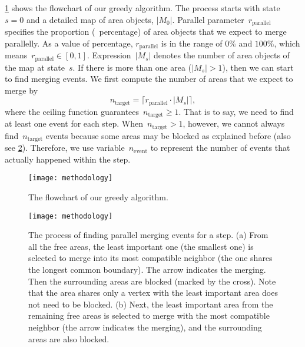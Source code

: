 \documentclass[ijgi,article,submit,moreauthors,pdftex]{Definitions/mdpi}
\begin{document}
\fig\ref{fig:greedy_framework} shows the flowchart of our greedy algorithm.
The process starts with state~$s=0$ and a detailed map of area objects, $|M_0|$.
Parallel parameter~$r_\mathrm{parallel}$ specifies 
the proportion (\ie~percentage) of area objects that
we expect to merge parallelly.
As a value of percentage, $r_\mathrm{parallel}$ is in the range of $0\%$ and $100\%$,
which means~$r_\mathrm{parallel} \in [0,1]$.
Expression~$|M_s|$ denotes the number of area objects of the map at state~$s$.
If there is more than one area ($|M_s|>1$),
then we can start to find merging events.
We first compute the number of areas that we expect to merge by
\begin{equation}
\label{eq:n_target}
n_\mathrm{target} =
\lceil r_\mathrm{parallel} \cdot |M_s| \rceil,
\end{equation}
where the ceiling function guarantees~$n_\mathrm{target}\ge 1$.
That is to say, we need to find at least one event for each step.
When~$n_\mathrm{target} > 1$, however,
we cannot always find~$n_\mathrm{target}$ events
because some areas may be blocked as explained before
(also see \fig\ref{fig:blocked_polygons}).
Therefore, we use variable~$n_\mathrm{event}$
to represent the number of events that actually happened within the step. 


\begin{figure}[tb]
\centering
\texttt{[image: methodology]}
\caption{The flowchart of our greedy algorithm.
}
\label{fig:greedy_framework}
\end{figure}


\begin{figure}[tb]
\centering
\texttt{[image: methodology]}
\caption{The process of finding parallel merging events for a step.
    (a) From all the free areas,
	the least important one (the smallest one) is selected to merge into
	its most compatible neighbor (the one shares the longest common boundary).
    The arrow indicates the merging.
	Then the surrounding areas are blocked (marked by the cross).
    Note that the area shares only a vertex with the least important area 
    does not need to be blocked.
	(b) Next, the least important area from the remaining free areas
	is selected to merge with the most compatible neighbor
	(the arrow indicates the merging),
	and the surrounding areas are also blocked.
}
\label{fig:blocked_polygons}
\end{figure}
\end{document}
